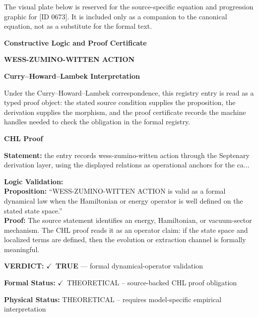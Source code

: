 \begingroup\footnotesize\sloppy
The visual plate below is reserved for the source-specific equation and progression graphic for [ID 0673]. It is included only as a companion to the canonical equation, not as a substitute for the formal text.
\par\endgroup
\ifTZPDarkEdition
{}
\fi

\clearpage
\begingroup\tzpsupportsetup
\noindent\textbf{\fontsize{10.8pt}{12.8pt}\selectfont [ID 0673] Constructive Logic and Proof Certificate}\par
\noindent\textbf{\fontsize{10pt}{12pt}\selectfont WESS-ZUMINO-WITTEN ACTION}\par
\vspace{0.45em}
\begingroup
\footnotesize
\setlength{\parskip}{0.22em}
\setlength{\parindent}{0pt}
\noindent\textbf{Curry--Howard--Lambek Interpretation}\par
Under the Curry--Howard--Lambek correspondence, this registry entry is read as a typed proof
object: the stated source condition supplies the proposition, the derivation supplies the
morphism, and the proof certificate records the machine handles needed to check the obligation
in the formal registry.

\vspace{0.45em}
\noindent\textbf{CHL Proof}\par
\textbf{Statement:} the entry records wess-zumino-witten action through the Septenary derivation layer,
using the displayed relations as operational anchors for the ca...

\textbf{Logic Validation:}\\
\textbf{Proposition:} ``WESS-ZUMINO-WITTEN ACTION is valid as a formal dynamical law when the Hamiltonian or
energy operator is well defined on the stated state space.''\\
\textbf{Proof:} The source statement identifies an energy, Hamiltonian, or vacuum-sector mechanism. The
CHL proof reads it as an operator claim: if the state space and localized terms are
defined, then the evolution or extraction channel is formally meaningful.

\textbf{VERDICT:} \ensuremath{\checkmark}\ \textbf{TRUE} --- formal dynamical-operator validation

\textbf{Formal Status:} \ensuremath{\checkmark}\ THEORETICAL -- source-backed CHL proof obligation

\textbf{Physical Status:} THEORETICAL -- requires model-specific empirical interpretation
\par\vspace{0.45em}
\par
\ifTZPDarkEdition
{}
\fi
\endgroup
\endgroup
